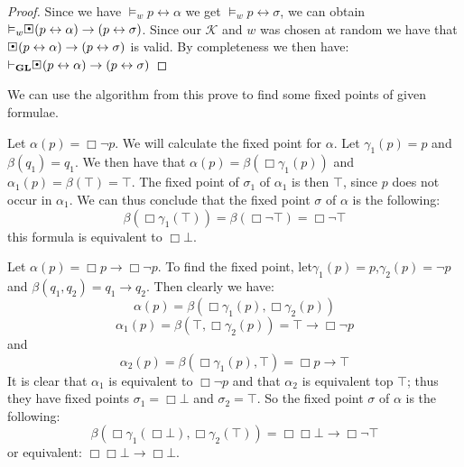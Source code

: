 \documentclass[../main.tex]{subfiles}
\begin{document}
\begin{proof}
	Since we have $\vDash_w p\leftrightarrow\alpha$ we get $\vDash_w
	p\leftrightarrow\sigma$, we can obtain
	$\vDash_w\sBox(p\leftrightarrow\alpha)\rightarrow(p\leftrightarrow\sigma)$.
	Since our $\mathcal{K}$ and $w$ was chosen at random we have that
	$\sBox(p\leftrightarrow\alpha)\rightarrow(p\leftrightarrow\sigma)$ is
	valid. By completeness we then have:
	$\vdash_\GL\sBox(p\leftrightarrow\alpha)\rightarrow(p\leftrightarrow
	\sigma)$
\end{proof}
We can use the algorithm from this prove to find some fixed points of given
formulae.

\begin{exmp}
	Let $\alpha(p)=\Box \neg p$. We will calculate the fixed point for
	$\alpha$. Let $\gamma_1 (p)=p$ and $\beta(q_1)=q_1$. We then have that
	$\alpha(p)=\beta(\Box\gamma_1(p))$ and $\alpha_1(p)=\beta(\top)=\top$.
	The fixed point of $\sigma_1$ of $\alpha_1$ is then $\top$, since $p$
	does not occur in $\alpha_1$. We can thus conclude that the fixed point
	$\sigma$ of $\alpha$ is the following:
	\[\beta(\Box\gamma_1(\top))=\beta(\Box\neg\top)=\Box\neg\top\]
	this formula is equivalent to $\Box\bot$.
\end{exmp}
\begin{exmp}
	Let $\alpha(p)=\Box p\rightarrow\Box\neg p$. To find the fixed point,
	let$\gamma_1(p)=p$,$\gamma_2(p)=\neg p$ and
	$\beta(q_1,q_2)=q_1\rightarrow q_2$. Then clearly we have:
	\[\alpha(p)=\beta(\Box\gamma_1(p),\Box\gamma_2(p))\]
	\[\alpha_1(p)=\beta(\top,\Box\gamma_2(p))=\top\rightarrow\Box\neg p\]
	and 
	\[\alpha_2(p)=\beta(\Box\gamma_1(p),\top)=\Box p\rightarrow \top\]
	It is clear that $\alpha_1$ is equivalent to $\Box\neg p$ and that
	$\alpha_2$ is equivalent top $\top$; thus they have fixed points
	$\sigma_1=\Box\bot$ and $\sigma_2=\top$. So the fixed point $\sigma$
	of $\alpha$ is the following:
	\[\beta(\Box\gamma_1(\Box\bot),\Box\gamma_2(\top))=\Box\Box\bot\rightarrow\Box\neg\top\]
	or equivalent: $\Box\Box\bot\rightarrow\Box\bot$.
\end{exmp}
\end{document}
